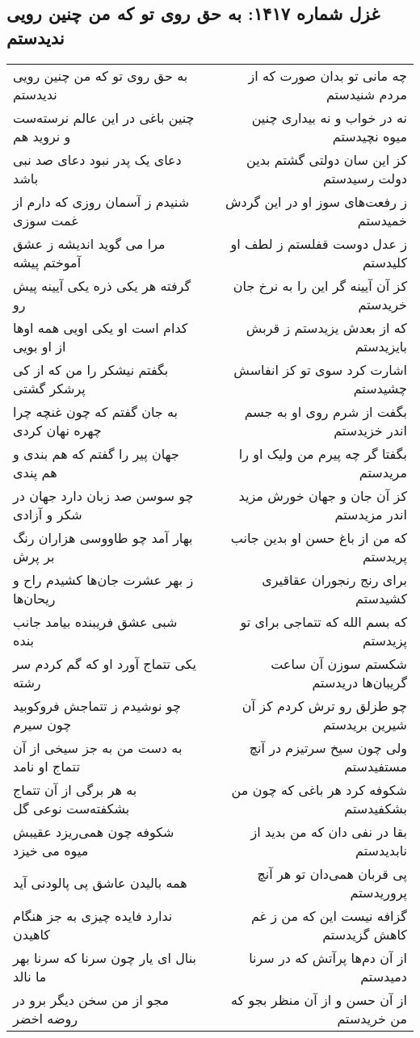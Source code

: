 \begin{center}
\section*{غزل شماره ۱۴۱۷: به حق روی تو که من چنین رویی ندیدستم}
\label{sec:1417}
\begin{longtable}{l p{0.5cm} r}
به حق روی تو که من چنین رویی ندیدستم
&&
چه مانی تو بدان صورت که از مردم شنیدستم
\\
چنین باغی در این عالم نرسته‌ست و نروید هم
&&
نه در خواب و نه بیداری چنین میوه نچیدستم
\\
دعای یک پدر نبود دعای صد نبی باشد
&&
کز این سان دولتی گشتم بدین دولت رسیدستم
\\
شنیدم ز آسمان روزی که دارم از غمت سوزی
&&
ز رفعت‌های سوز او در این گردش خمیدستم
\\
مرا می گوید اندیشه ز عشق آموختم پیشه
&&
ز عدل دوست قفلستم ز لطف او کلیدستم
\\
گرفته هر یکی ذره یکی آیینه پیش رو
&&
کز آن آیینه گر این را به نرخ جان خریدستم
\\
کدام است او یکی اویی همه اوها از او بویی
&&
که از بعدش یزیدستم ز قربش بایزیدستم
\\
بگفتم نیشکر را من که از کی پرشکر گشتی
&&
اشارت کرد سوی تو کز انفاسش چشیدستم
\\
به جان گفتم که چون غنچه چرا چهره نهان کردی
&&
بگفت از شرم روی او به جسم اندر خزیدستم
\\
جهان پیر را گفتم که هم بندی و هم پندی
&&
بگفتا گر چه پیرم من ولیک او را مریدستم
\\
چو سوسن صد زبان دارد جهان در شکر و آزادی
&&
کز آن جان و جهان خورش مزید اندر مزیدستم
\\
بهار آمد چو طاووسی هزاران رنگ بر پرش
&&
که من از باغ حسن او بدین جانب پریدستم
\\
ز بهر عشرت جان‌ها کشیدم راح و ریحان‌ها
&&
برای رنج رنجوران عقاقیری کشیدستم
\\
شبی عشق فریبنده بیامد جانب بنده
&&
که بسم الله که تتماجی برای تو پزیدستم
\\
یکی تتماج آورد او که گم کردم سر رشته
&&
شکستم سوزن آن ساعت گریبان‌ها دریدستم
\\
چو نوشیدم ز تتماجش فروکوبید چون سیرم
&&
چو طزلق رو ترش کردم کز آن شیرین بریدستم
\\
به دست من به جز سیخی از آن تتماج او نامد
&&
ولی چون سیخ سرتیزم در آنچ مستفیدستم
\\
به هر برگی از آن تتماج بشکفته‌ست نوعی گل
&&
شکوفه کرد هر باغی که چون من بشکفیدستم
\\
شکوفه چون همی‌ریزد عقیبش میوه می خیزد
&&
بقا در نفی دان که من بدید از نابدیدستم
\\
همه بالیدن عاشق پی پالودنی آید
&&
پی قربان همی‌دان تو هر آنچ پروریدستم
\\
ندارد فایده چیزی به جز هنگام کاهیدن
&&
گزافه نیست این که من ز غم کاهش گزیدستم
\\
بنال ای یار چون سرنا که سرنا بهر ما نالد
&&
از آن دم‌ها پرآتش که در سرنا دمیدستم
\\
مجو از من سخن دیگر برو در روضه اخضر
&&
از آن حسن و از آن منظر بجو که من خریدستم
\\
\end{longtable}
\end{center}
